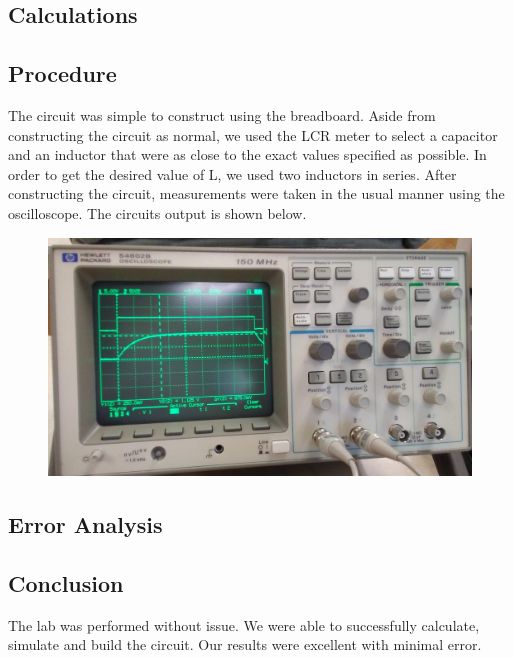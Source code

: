 \documentclass[11pt]{article}
\begin{document}
	
	\subsection*{Calculations}
	
	\subsection*{Procedure}
	The circuit was simple to construct using the breadboard. Aside from constructing the circuit as normal, we used the LCR meter to select a capacitor and an inductor that were as close to the exact values specified as possible. In order to get the desired value of L, we used two inductors in series. After constructing the circuit, measurements were taken in the usual manner using the oscilloscope. The circuits output is shown below.
		\begin{figure}[H]
		\centering
		\includegraphics[width=5in]{images/oscilloscope_transfer.jpg}
		\end{figure}
	\subsection*{Error Analysis}
	
	
	
	\subsection*{Conclusion}
	The lab was performed without issue. We were able to successfully calculate, simulate and build the circuit. Our results were excellent with minimal error. 
	
	
\end{document}
